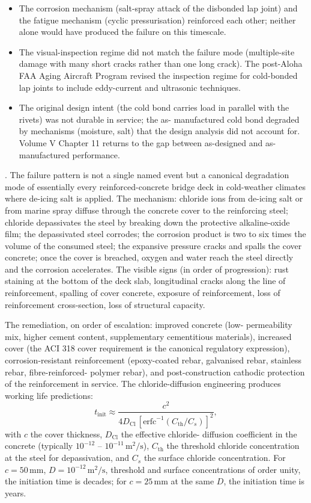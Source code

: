 \begin{itemize}[leftmargin=*]
\item The corrosion mechanism (salt-spray attack of the disbonded lap
  joint) and the fatigue mechanism (cyclic pressurisation) reinforced
  each other; neither alone would have produced the failure on this
  timescale.
\item The visual-inspection regime did not match the failure mode
  (multiple-site damage with many short cracks rather than one long
  crack). The post-Aloha FAA Aging Aircraft Program revised the
  inspection regime for cold-bonded lap joints to include eddy-current
  and ultrasonic techniques.
\item The original design intent (the cold bond carries load in
  parallel with the rivets) was not durable in service; the as-
  manufactured cold bond degraded by mechanisms (moisture, salt) that
  the design analysis did not account for. Volume V Chapter 11 returns
  to the gap between as-designed and as-manufactured performance.
\end{itemize}

. The failure pattern is not a single named event but a
canonical degradation mode of essentially every reinforced-concrete
bridge deck in cold-weather climates where de-icing salt is applied.
The mechanism: chloride ions from de-icing salt or from marine spray
diffuse through the concrete cover to the reinforcing steel; chloride
depassivates the steel by breaking down the protective alkaline-oxide
film; the depassivated steel corrodes; the corrosion product is
two to six times the volume of the consumed steel; the expansive
pressure cracks and spalls the cover concrete; once the cover is
breached, oxygen and water reach the steel directly and the corrosion
accelerates. The visible signs (in order of progression): rust
staining at the bottom of the deck slab, longitudinal cracks along
the line of reinforcement, spalling of cover concrete, exposure of
reinforcement, loss of reinforcement cross-section, loss of structural
capacity.

The remediation, on order of escalation: improved concrete (low-
permeability mix, higher cement content, supplementary cementitious
materials), increased cover (the ACI 318 cover requirement is the
canonical regulatory expression), corrosion-resistant reinforcement
(epoxy-coated rebar, galvanised rebar, stainless rebar, fibre-reinforced-
polymer rebar), and post-construction cathodic protection of the
reinforcement in service. The chloride-diffusion engineering produces
working life predictions:
\[
t_{\text{init}} \approx \frac{c^2}{4 D_{\text{Cl}} \,
[\text{erfc}^{-1}(C_{\text{th}}/C_s)]^2},
\]
with $c$ the cover thickness, $D_{\text{Cl}}$ the effective chloride-
diffusion coefficient in the concrete (typically $10^{-12}$ -- $10^{-11}\,
\text{m}^2/\text{s}$), $C_{\text{th}}$ the threshold chloride
concentration at the steel for depassivation, and $C_s$ the surface
chloride concentration. For $c = 50\,\text{mm}$, $D = 10^{-12}\,
\text{m}^2/\text{s}$, threshold and surface concentrations of order
unity, the initiation time is decades; for $c = 25\,\text{mm}$ at the
same $D$, the initiation time is years.

